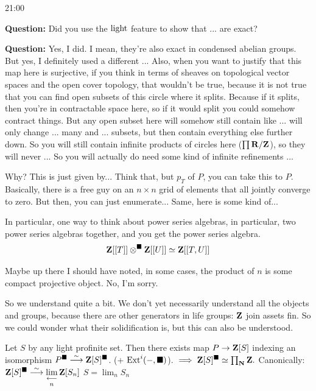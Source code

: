 \begin{unfinished}{21:00}
\begin{sketch}
\textbf{Question:} Did you use the $\mathrm{light}$ feature to show that ... are exact?

\textbf{Question:} Yes, I did. I mean, they're also exact in condensed abelian groups. But yes, I definitely used a different ...
Also, when you want to justify that this map here is surjective, if you think in terms of sheaves on topological vector spaces and the open cover topology, that wouldn't be true, because it is not true that you can find open subsets of this circle where it splits. 
Because if it splits, then you're in contractable space here, so if it would split you could somehow contract things.
But any open subset here will somehow still contain like ...  will only change ... many and ... subsets, but then contain everything else further down.
So you will still contain infinite products of circles here ($\prod \mathbf R / \mathbf Z$), so they will never ... 
So you will actually do need some kind of infinite refinements ...

Why? This is just given by... Think that, but $p_T$ of $P$, you can take this to $P$. Basically, there is a free guy on an $n \times n$ grid of elements that all jointly converge to zero. But then, you can just enumerate... Same, here is some kind of... 

In particular, one way to think about power series algebras, in particular, two power series algebras together, and you get the power series algebra. 
\begin{align*}
\mathbf Z[[T]] \otimes^\blacksquare \mathbf Z[[U]] \simeq \mathbf Z[[T, U]]
\end{align*}

Maybe up there I should have noted, in some cases, the product of $n$ is some compact projective object. No, I'm sorry.

So we understand quite a bit. We don't yet necessarily understand all the objects and groups, because there are other generators in life groups: $\mathbf Z$ join assets fin. So we could wonder what their solidification is, but this can also be understood.

\begin{proposition}
Let $S$ by any light profinite set. Then there exists map $P \to \mathbf Z[S]$ indexing an isomorphism $P^\blacksquare \overset\sim\longrightarrow \mathbf Z[S]^\blacksquare$. (+ $\operatorname{Ext}^i(-,\blacksquare)$).
$\implies \mathbf Z[S]^\blacksquare \simeq \prod_\mathbf N \mathbf Z.$
Canonically: $\mathbf Z[S]^\blacksquare \overset\sim\longrightarrow \mathop{\operatorname*{lim}\limits_{\longleftarrow}}\limits_n \mathbf Z[S_n]$
$S = \lim_n S_n$
\end{proposition}


\end{sketch}
\end{unfinished}
